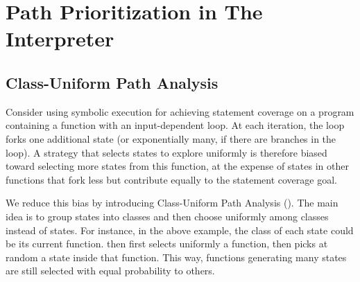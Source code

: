
\section{Path Prioritization in The Interpreter}
\label{sec:chef:strategies}





\subsection{Class-Uniform Path Analysis}

Consider using symbolic execution for achieving statement coverage on a program containing a function with an input-dependent loop.  At each iteration, the loop forks one additional state (or exponentially many, if there are branches in the loop). A strategy that selects states to explore uniformly is therefore biased toward selecting more states from this function, at the expense of states in other functions that fork less but contribute equally to the statement coverage goal.

We reduce this bias by introducing Class-Uniform Path Analysis (\cupa).
%
The main idea is to group states into classes and then choose uniformly among classes instead of states.  For instance, in the above example, the class of each state could be its current function.  \cupa then first selects uniformly a function, then picks at random a state inside that function.  This way, functions generating many states are still selected with equal probability to others.

